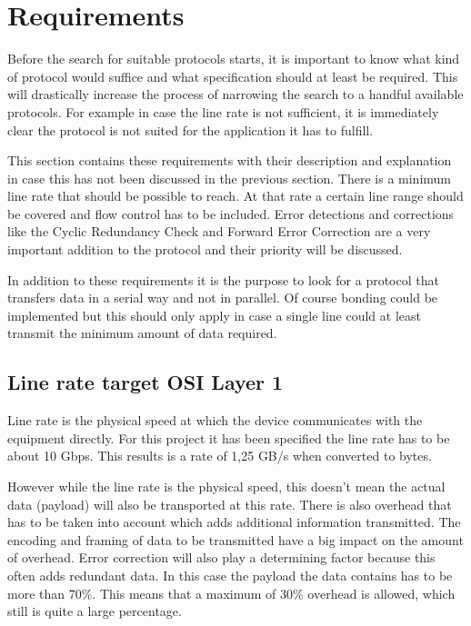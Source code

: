 \section{Requirements}
\label{sec:requirements}
Before the search for suitable protocols starts, it is important to know what kind of protocol would suffice and what specification should at least be required. 
This will drastically increase the process of narrowing the search to a handful available protocols. For example in case the line rate is not sufficient, it is immediately clear the protocol is not suited for the application it has to fulfill.

This section contains these requirements with their description and explanation in case this has not been discussed in the previous section. There is a minimum line rate that should be possible to reach. At that rate a certain line range should be covered and flow control has to be included. Error detections and corrections like the Cyclic Redundancy Check and Forward Error Correction are a very important addition to the protocol and their priority will be discussed.

In addition to these requirements it is the purpose to look for a protocol that transfers data in a serial way and not in parallel. Of course bonding could be implemented but this should only apply in case a single line could at least transmit the minimum amount of data required.

\subsection[Line rate target]{Line rate target \hfill OSI Layer 1}
Line rate is the physical speed at which the device communicates with the equipment directly. For this project it has been specified the line rate has to be about 10 Gbps. This results is a rate of 1,25 GB/s when converted to bytes.

However while the line rate is the physical speed, this doesn't mean the actual data (payload) will also be transported at this rate. There is also overhead that has to be taken into account which adds additional information transmitted. The encoding and framing of data to be transmitted have a big impact on the amount of overhead. Error correction will also play a determining factor because this often adds redundant data.
In this case the payload the data contains has to be more than 70\%. This means that a maximum of 30\% overhead is allowed, which still is quite a large percentage.\\

